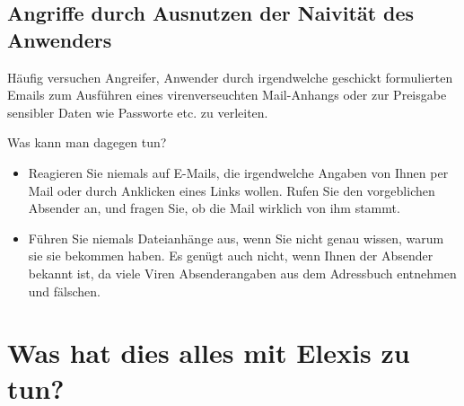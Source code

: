 \subsection{Angriffe durch Ausnutzen der Naivität des Anwenders}

Häufig versuchen Angreifer, Anwender durch irgendwelche geschickt formulierten Emails zum Ausführen eines virenverseuchten Mail-Anhangs oder
zur Preisgabe sensibler Daten wie Passworte etc. zu verleiten.

Was kann man dagegen tun?

\begin{itemize}
    \item{Reagieren Sie niemals auf E-Mails, die irgendwelche Angaben von Ihnen per Mail oder durch Anklicken eines Links wollen.
    Rufen Sie den vorgeblichen Absender an, und fragen Sie, ob die Mail wirklich von ihm stammt.}
    \item{Führen Sie niemals Dateianhänge aus, wenn Sie nicht genau wissen, warum sie sie bekommen haben. Es genügt auch nicht, wenn Ihnen der
    Absender bekannt ist, da viele Viren Absenderangaben aus dem Adressbuch entnehmen und fälschen.}
\end{itemize}

\section{Was hat dies alles mit Elexis zu tun?}

